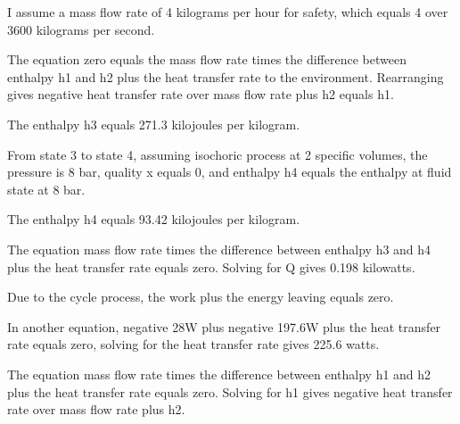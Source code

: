 I assume a mass flow rate of 4 kilograms per hour for safety, which equals 4 over 3600 kilograms per second.

The equation zero equals the mass flow rate times the difference between enthalpy h1 and h2 plus the heat transfer rate to the environment. Rearranging gives negative heat transfer rate over mass flow rate plus h2 equals h1.

The enthalpy h3 equals 271.3 kilojoules per kilogram.

From state 3 to state 4, assuming isochoric process at 2 specific volumes, the pressure is 8 bar, quality x equals 0, and enthalpy h4 equals the enthalpy at fluid state at 8 bar.

The enthalpy h4 equals 93.42 kilojoules per kilogram.

The equation mass flow rate times the difference between enthalpy h3 and h4 plus the heat transfer rate equals zero. Solving for Q gives 0.198 kilowatts.

Due to the cycle process, the work plus the energy leaving equals zero.

In another equation, negative 28W plus negative 197.6W plus the heat transfer rate equals zero, solving for the heat transfer rate gives 225.6 watts.

The equation mass flow rate times the difference between enthalpy h1 and h2 plus the heat transfer rate equals zero. Solving for h1 gives negative heat transfer rate over mass flow rate plus h2.